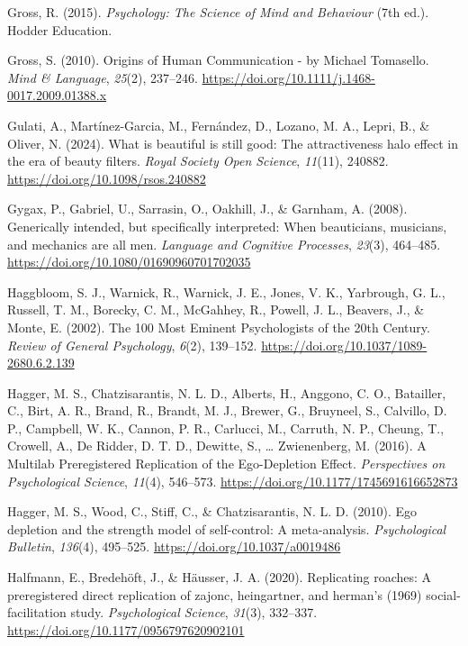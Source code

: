 \documentclass[
  letterpaper,
]{book}
\newlength{\cslhangindent}
\newenvironment{CSLReferences}[2] %
 {\begin{list}{}{%
  \setlength{\itemindent}{0pt}
  \setlength{\leftmargin}{0pt}
  \setlength{\parsep}{0pt}
  \ifodd #1
   \setlength{\leftmargin}{\cslhangindent}
   \setlength{\itemindent}{-1\cslhangindent}
  \fi
  \setlength{\itemsep}{#2\baselineskip}}}
 {\end{list}}
\begin{document}
\begin{CSLReferences}{1}{0}
Gross, R. (2015). \emph{Psychology: {The} {Science} of {Mind} and
{Behaviour}} (7th ed.). Hodder Education.

Gross, S. (2010). Origins of {Human} {Communication} - by {Michael}
{Tomasello}. \emph{Mind \& Language}, \emph{25}(2), 237--246.
\url{https://doi.org/10.1111/j.1468-0017.2009.01388.x}

Gulati, A., Martínez-Garcia, M., Fernández, D., Lozano, M. A., Lepri,
B., \& Oliver, N. (2024). What is beautiful is still good: The
attractiveness halo effect in the era of beauty filters. \emph{Royal
Society Open Science}, \emph{11}(11), 240882.
\url{https://doi.org/10.1098/rsos.240882}

Gygax, P., Gabriel, U., Sarrasin, O., Oakhill, J., \& Garnham, A.
(2008). Generically intended, but specifically interpreted: {When}
beauticians, musicians, and mechanics are all men. \emph{Language and
Cognitive Processes}, \emph{23}(3), 464--485.
\url{https://doi.org/10.1080/01690960701702035}

Haggbloom, S. J., Warnick, R., Warnick, J. E., Jones, V. K., Yarbrough,
G. L., Russell, T. M., Borecky, C. M., McGahhey, R., Powell, J. L.,
Beavers, J., \& Monte, E. (2002). {The 100 Most Eminent Psychologists of
the 20th Century}. \emph{{Review of General Psychology}}, \emph{6}(2),
139--152. \url{https://doi.org/10.1037/1089-2680.6.2.139}

Hagger, M. S., Chatzisarantis, N. L. D., Alberts, H., Anggono, C. O.,
Batailler, C., Birt, A. R., Brand, R., Brandt, M. J., Brewer, G.,
Bruyneel, S., Calvillo, D. P., Campbell, W. K., Cannon, P. R., Carlucci,
M., Carruth, N. P., Cheung, T., Crowell, A., De Ridder, D. T. D.,
Dewitte, S., \ldots{} Zwienenberg, M. (2016). A {Multilab}
{Preregistered} {Replication} of the {Ego}-{Depletion} {Effect}.
\emph{Perspectives on Psychological Science}, \emph{11}(4), 546--573.
\url{https://doi.org/10.1177/1745691616652873}

Hagger, M. S., Wood, C., Stiff, C., \& Chatzisarantis, N. L. D. (2010).
Ego depletion and the strength model of self-control: A meta-analysis.
\emph{Psychological Bulletin}, \emph{136}(4), 495--525.
\url{https://doi.org/10.1037/a0019486}

Halfmann, E., Bredehöft, J., \& Häusser, J. A. (2020). Replicating
roaches: A preregistered direct replication of zajonc, heingartner, and
herman's (1969) social-facilitation study. \emph{Psychological Science},
\emph{31}(3), 332--337. \url{https://doi.org/10.1177/0956797620902101}


\end{CSLReferences}
\end{document}
